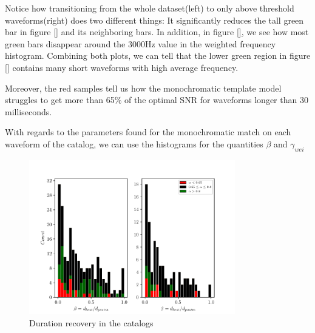 Notice how transitioning from the whole dataset(left) to only above threshold waveforms(right) does two different things: It significantly reduces the tall green bar in figure \ref{}  and its neighboring bars. In addition, in figure \ref{}, we see how most green bars disappear around the 3000Hz value in the weighted frequency histogram. Combining both plots, we can tell that the lower green region in figure \ref{} contains many short waveforms with high average frequency.

Moreover, the red samples tell us how the monochromatic template model struggles to get more than 65\% of the optimal SNR for waveforms longer than 30 milliseconds. 


\newpage 

With regards to the parameters found for the monochromatic match on each waveform of the catalog, we can use the histograms for the quantities  $\beta$ and $\gamma_{wei}$ 

\begin{figure}[hbt!]
\begin{center}
\includegraphics[width=0.8\textwidth, angle=0]{images/Data_analysis/results/alpha_betahist.pdf}
\caption{Duration recovery in the catalogs}
\label{abhist}
\end{center}
\end{figure}

